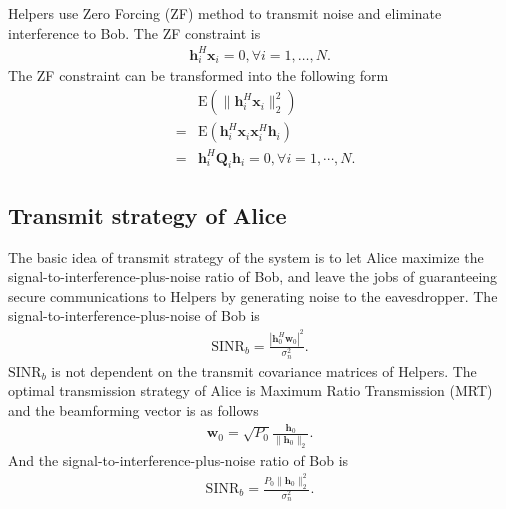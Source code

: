 \documentclass[conference]{IEEEtran}
\begin{document}
Helpers use Zero Forcing (ZF) method to transmit noise and eliminate interference to Bob.
The ZF constraint is 
\begin{eqnarray}
\mathbf{h}_i^H\mathbf{x}_i =0 , \forall i = 1,\dots, N\label{eq:ZF_constraint}.
\end{eqnarray}
The ZF constraint can be transformed into the following form
\begin{eqnarray}
&&\mathrm{E}(\|\mathbf{h}_i^H\mathbf{x}_i\|_2^2)\nonumber\\
&=&\mathrm{E}(\mathbf{h}_i^H\mathbf{x}_i\mathbf{x}_i^H\mathbf{h}_i)\nonumber\\
&=&\mathbf{h}_i^H\mathbf{Q}_i \mathbf{h}_i = 0, \forall i = 1,\cdots,N \label{eq:ZF_constraint_relaxed}.
\end{eqnarray}
\subsection{Transmit strategy of Alice}
The basic idea of transmit strategy of the system is to let Alice maximize the signal-to-interference-plus-noise ratio of Bob, and leave the jobs of guaranteeing secure communications to Helpers by generating noise to the eavesdropper.  The signal-to-interference-plus-noise of Bob is 
\begin{eqnarray}
\mathrm{SINR}_b= \frac{\left| \mathbf{h}_{0}^H\mathbf{w}_{0}\right|^2}{\sigma_n^2 }. 
\end{eqnarray}
$\mathrm{SINR}_b$ is not dependent on the transmit covariance matrices of Helpers. The optimal transmission strategy of Alice is Maximum Ratio Transmission (MRT) and the beamforming vector is as follows
\begin{eqnarray}
\mathbf{w}_0 = \sqrt{P_0}\frac{\mathbf{h}_0}{\|\mathbf{h}_0\|_2} \label{eq:optimal_w}.
\end{eqnarray}
And the signal-to-interference-plus-noise ratio of Bob is
\begin{eqnarray} 
\mathrm{SINR}_b= \frac{P_0\| \mathbf{h}_{0}\|_2^2}{\sigma_n^2 }.  \label{eq:SINR_b}
\end{eqnarray}
\end{document}
